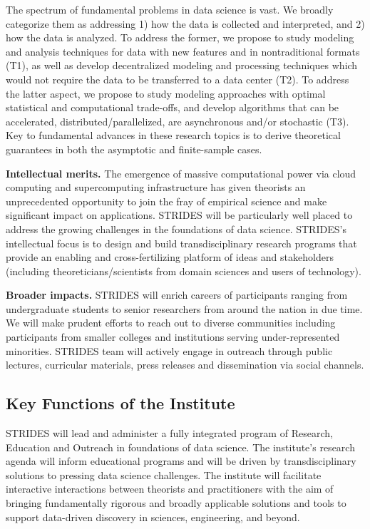 \documentclass[12pt]{article}
\begin{document}
The spectrum of fundamental problems in data science is vast. We broadly categorize them as
addressing 1) how the data is collected and interpreted, and 2) how the data is analyzed.
To address the former, we propose to study modeling and analysis techniques for data with new features and in nontraditional formats (T1), as well as develop decentralized modeling and
processing techniques which would not require the data to be transferred to a data center (T2).
To address the latter aspect, we propose to study modeling approaches with optimal statistical
and computational trade-offs, and develop algorithms that can be accelerated, distributed/parallelized, are asynchronous and/or stochastic (T3).
Key to fundamental advances in these research topics is to derive theoretical guarantees in both the asymptotic and finite-sample cases.

{\bf Intellectual merits.}
The emergence of massive computational power via cloud computing and supercomputing infrastructure
has given theorists an unprecedented opportunity to join the fray of empirical science and make
significant impact on applications. STRIDES will be particularly well placed to address the growing challenges in the foundations of data science. STRIDES's intellectual focus is to design and build
transdisciplinary research programs that provide an enabling and cross-fertilizing platform of ideas and stakeholders (including theoreticians/scientists from domain sciences and users of technology).


{\bf Broader impacts.}
STRIDES will enrich careers of participants ranging from undergraduate students to senior researchers from around the nation in due time. We will make prudent efforts to reach out to diverse
communities including participants from smaller colleges and institutions serving under-represented minorities. STRIDES team will actively engage in outreach through public lectures, curricular
materials, press releases and dissemination via social channels.

\vspace*{-1em}
\subsection{Key Functions of the Institute}
STRIDES will lead and administer a fully integrated program of Research, Education and Outreach in foundations of data science.  The institute's research agenda will inform educational programs and
will be driven by transdisciplinary solutions to pressing data science challenges.  The institute will facilitate interactive interactions between theorists and practitioners with the aim of bringing fundamentally rigorous and broadly applicable solutions and tools to support data-driven discovery in sciences, engineering, and beyond.
\end{document}
